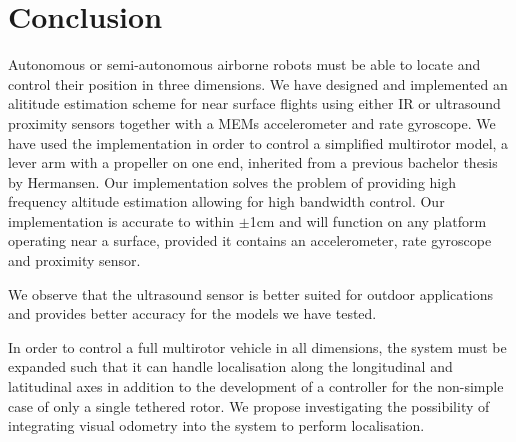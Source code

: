 \section{Conclusion}\label{sec:conclusion}
Autonomous or semi-autonomous airborne robots must be able to locate and control their position in three dimensions. We have designed
and implemented an alititude estimation scheme for near surface flights using either IR or ultrasound proximity sensors together with 
a MEMs accelerometer and rate gyroscope. We have used the implementation in order to control a simplified multirotor model, a lever arm with a propeller 
on one end, inherited from a previous bachelor thesis by Hermansen. Our implementation solves the problem of providing high frequency altitude estimation
allowing for high bandwidth control. Our implementation is accurate to within \(\pm\)1cm and will function on any platform
operating near a surface, provided it contains an accelerometer, rate gyroscope and proximity sensor.

We observe that the ultrasound 
sensor is better suited for outdoor applications and provides better accuracy for the models we have tested.

In order to control a full multirotor vehicle in all dimensions, the system must be expanded such that it can handle localisation 
along the longitudinal and latitudinal axes in addition to the development of a controller for the non-simple case of only a single tethered rotor. 
We propose investigating the possibility of integrating visual odometry into the system to perform localisation.
